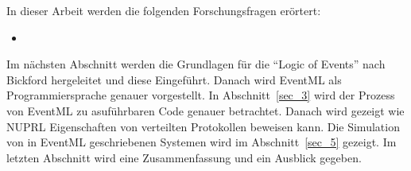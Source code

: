 In dieser Arbeit werden die folgenden Forschungsfragen erörtert:
\begin{itemize}
  \item 
\end{itemize}


Im nächsten Abschnitt werden die Grundlagen für die ``Logic of Events'' nach
Bickford hergeleitet und diese Eingeführt. Danach wird EventML
als Programmiersprache genauer vorgestellt. In Abschnitt~\ref{sec_3} wird
der Prozess von EventML zu asuführbaren Code genauer betrachtet. Danach wird gezeigt wie
NUPRL Eigenschaften von verteilten Protokollen beweisen kann. Die Simulation
von in EventML geschriebenen Systemen wird im Abschnitt~\ref{sec_5} gezeigt.
Im letzten Abschnitt wird eine Zusammenfassung und ein Ausblick gegeben.
